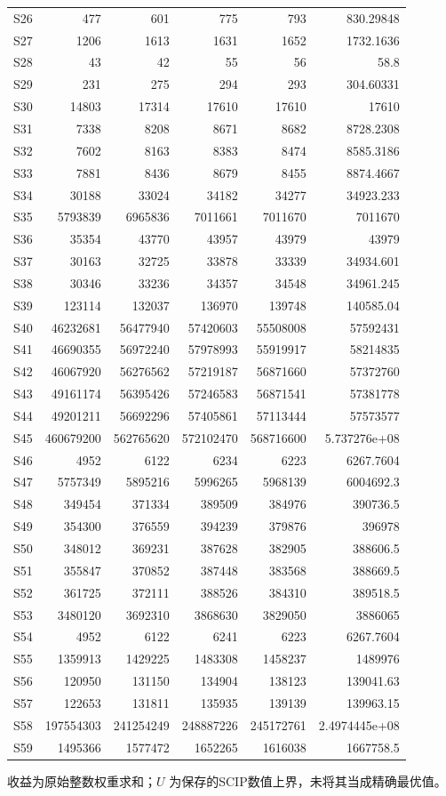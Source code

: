 {\begin{longtable}{lrrrrr}
S26 & 477 & 601 & 775 & 793 & 830.29848\\
S27 & 1206 & 1613 & 1631 & 1652 & 1732.1636\\
S28 & 43 & 42 & 55 & 56 & 58.8\\
S29 & 231 & 275 & 294 & 293 & 304.60331\\
S30 & 14803 & 17314 & 17610 & 17610 & 17610\\
S31 & 7338 & 8208 & 8671 & 8682 & 8728.2308\\
S32 & 7602 & 8163 & 8383 & 8474 & 8585.3186\\
S33 & 7881 & 8436 & 8679 & 8455 & 8874.4667\\
S34 & 30188 & 33024 & 34182 & 34277 & 34923.233\\
S35 & 5793839 & 6965836 & 7011661 & 7011670 & 7011670\\
S36 & 35354 & 43770 & 43957 & 43979 & 43979\\
S37 & 30163 & 32725 & 33878 & 33339 & 34934.601\\
S38 & 30346 & 33236 & 34357 & 34548 & 34961.245\\
S39 & 123114 & 132037 & 136970 & 139748 & 140585.04\\
S40 & 46232681 & 56477940 & 57420603 & 55508008 & 57592431\\
S41 & 46690355 & 56972240 & 57978993 & 55919917 & 58214835\\
S42 & 46067920 & 56276562 & 57219187 & 56871660 & 57372760\\
S43 & 49161174 & 56395426 & 57246583 & 56871541 & 57381778\\
S44 & 49201211 & 56692296 & 57405861 & 57113444 & 57573577\\
S45 & 460679200 & 562765620 & 572102470 & 568716600 & 5.737276e+08\\
S46 & 4952 & 6122 & 6234 & 6223 & 6267.7604\\
S47 & 5757349 & 5895216 & 5996265 & 5968139 & 6004692.3\\
S48 & 349454 & 371334 & 389509 & 384976 & 390736.5\\
S49 & 354300 & 376559 & 394239 & 379876 & 396978\\
S50 & 348012 & 369231 & 387628 & 382905 & 388606.5\\
S51 & 355847 & 370852 & 387448 & 383568 & 388669.5\\
S52 & 361725 & 372111 & 388526 & 384310 & 389518.5\\
S53 & 3480120 & 3692310 & 3868630 & 3829050 & 3886065\\
S54 & 4952 & 6122 & 6241 & 6223 & 6267.7604\\
S55 & 1359913 & 1429225 & 1483308 & 1458237 & 1489976\\
S56 & 120950 & 131150 & 134904 & 138123 & 139041.63\\
S57 & 122653 & 131811 & 135935 & 139139 & 139963.15\\
S58 & 197554303 & 241254249 & 248887226 & 245172761 & 2.4974445e+08\\
S59 & 1495366 & 1577472 & 1652265 & 1616038 & 1667758.5\\
\end{longtable}
}
收益为原始整数权重求和；$U$ 为保存的SCIP数值上界，未将其当成精确最优值。

